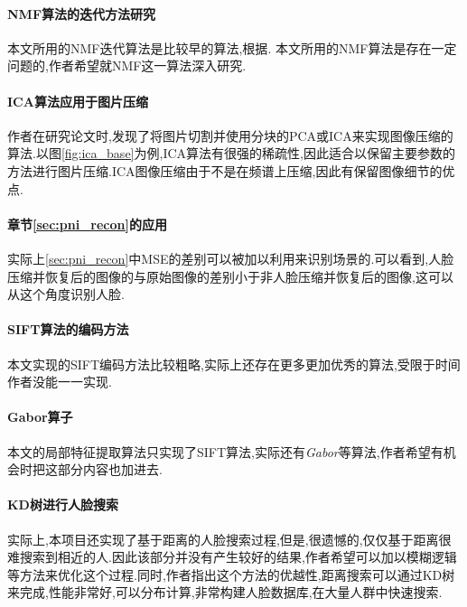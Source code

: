 \paragraph{NMF算法的迭代方法研究}
本文所用的NMF迭代算法是比较早的算法,根据\cite{lin2007projected}. 本文所用的NMF算法是存在一定问题的,作者希望就NMF这一算法深入研究.

\paragraph{ICA算法应用于图片压缩}
作者在研究论文时,发现了将图片切割并使用分块的PCA或ICA来实现图像压缩的算法.以图\ref{fig:ica_base}为例,ICA算法有很强的稀疏性,因此适合以保留主要参数的方法进行图片压缩.ICA图像压缩由于不是在频谱上压缩,因此有保留图像细节的优点.

\paragraph{章节\ref{sec:pni_recon}的应用}
实际上\ref{sec:pni_recon}中MSE的差别可以被加以利用来识别场景的.可以看到,人脸压缩并恢复后的图像的与原始图像的差别小于非人脸压缩并恢复后的图像,这可以从这个角度识别人脸.

\paragraph{SIFT算法的编码方法}
本文实现的SIFT编码方法比较粗略,实际上还存在更多更加优秀的算法,受限于时间作者没能一一实现.

\paragraph{Gabor算子}
本文的局部特征提取算法只实现了SIFT算法,实际还有\textit{Gabor}等算法,作者希望有机会时把这部分内容也加进去.

\paragraph{KD树进行人脸搜索}
实际上,本项目还实现了基于距离的人脸搜索过程,但是,很遗憾的,仅仅基于距离很难搜索到相近的人.因此该部分并没有产生较好的结果,作者希望可以加以模糊逻辑等方法来优化这个过程.同时,作者指出这个方法的优越性,距离搜索可以通过KD树来完成,性能非常好,可以分布计算,非常构建人脸数据库,在大量人群中快速搜索.
